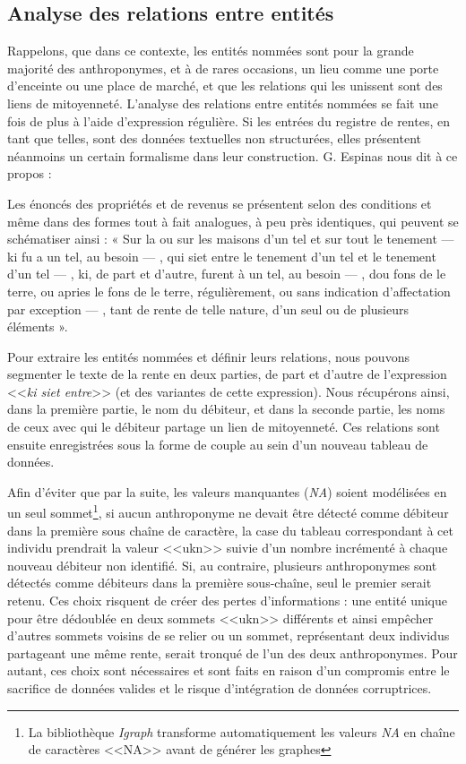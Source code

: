 \subsection{Analyse des relations entre entités}
Rappelons, que dans ce contexte, les entités nommées sont pour la grande majorité des anthroponymes, et à de rares occasions, un lieu comme une porte d'enceinte ou une place de marché, et que les relations qui les unissent sont des liens de mitoyenneté.
L'analyse des relations entre entités nommées se fait une fois de plus à l'aide d'expression régulière. Si les entrées du registre de rentes, en tant que telles, sont des données textuelles non structurées, elles présentent néanmoins un certain formalisme dans leur construction. G. Espinas nous dit à ce propos : 
\begin{displayquote}
    \og Les énoncés des propriétés et de revenus se présentent selon des conditions et même dans des formes tout à fait analogues, à peu près identiques, qui peuvent se schématiser ainsi : « Sur la ou sur les maisons d’un tel et sur tout le tenement — ki fu a un tel, au besoin — , qui siet entre le tenement d’un tel et le tenement d’un tel — , ki, de part et d’autre, furent à un tel, au besoin — , dou fons de le terre, ou apries le fons de le terre, régulièrement, ou sans indication d’affectation par exception — , tant de rente de telle nature, d’un seul ou de plusieurs éléments ».\fg{}
\end{displayquote} 
\vspace{0,5cm}
Pour extraire les entités nommées et définir leurs relations, nous pouvons segmenter le texte de la rente en deux parties, de part et d'autre de l'expression <<\textit{ki siet entre}>> (et des variantes de cette expression). Nous récupérons ainsi, dans la première partie, le nom du débiteur, et dans la seconde partie, les noms de ceux avec qui le débiteur partage un lien de mitoyenneté. Ces relations sont ensuite enregistrées sous la forme de couple au sein d'un nouveau tableau de données.

Afin d'éviter que par la suite, les valeurs manquantes (\textit{NA}) soient modélisées en un seul sommet\footnote{La bibliothèque \textit{Igraph} transforme automatiquement les valeurs \textit{NA} en chaîne de caractères <<NA>> avant de générer les graphes}, si aucun anthroponyme ne devait être détecté comme débiteur dans la première sous chaîne de caractère, la case du tableau correspondant à cet individu prendrait la valeur <<ukn>> suivie d'un nombre incrémenté à chaque nouveau débiteur non identifié. Si, au contraire, plusieurs anthroponymes sont détectés comme débiteurs  dans la première sous-chaîne, seul le premier serait retenu. Ces choix  risquent de créer des pertes d'informations :  une entité unique pour être dédoublée en deux sommets <<ukn>> différents et ainsi empêcher d'autres sommets voisins de se relier ou  un sommet, représentant deux individus partageant une même rente, serait tronqué de l'un des deux anthroponymes. Pour autant, ces choix  sont nécessaires et sont faits en raison d'un compromis entre le sacrifice de données valides et le risque d'intégration de données corruptrices.
